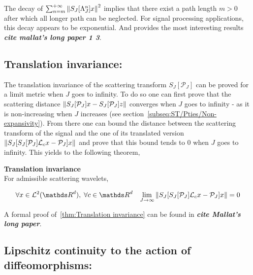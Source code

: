 \documentclass[a4paper,11pt]{report}
\begin{document}
{			The decay of $\sum_{n=m}^{+\infty} \left\lVert S_{J}[\Lambda_{J}^{n}]x \right\rVert^{2}$ implies that there exist a path length $m > 0$ after which all longer path can be neglected. For signal processing applications, this decay appears to be exponential. And  provides the most interesting results \textbf{\textit{cite mallat's long paper 1 3}}.
			
		\subsection{Translation invariance:}
			\label{subseq:ST/Pties/Translation}
			
			The translation invariance of the scattering transform $S_{J}[\mathcal{P}_{J}]$ can be proved for a limit metric when $J$ goes to infinity. To do so one can first prove that the scattering distance $\left\lVert S_{J}[\mathcal{P}_{J}]x - S_{J}[\mathcal{P}_{J}]z \right\rVert$ converges when $J$ goes to infinity - as it is non-increasing when $J$ increases (see section~\ref{subseq:ST/Pties/Non-expansivity}). From there one can bound the distance between the scattering transform of the signal and the one of its translated version $\left\lVert S_{J}[ S_{J}[\mathcal{P}_{J}]\mathcal{L}_{c}x - \mathcal{P}_{J}]x \right\rVert$ and prove that this bound tends to $0$ when $J$ goes to infinity. This yields to the following theorem,
			
			\begin{thm} \textbf{Translation invariance}\\
				For admissible scattering wavelets,
				
				\begin{equation}
					\forall x \in \mathcal{L}^{2}(\dsR^{d}), \; \forall c \in \dsR^{d} \;\;\; \lim_{J \rightarrow \infty} \norm{S_{J}[ S_{J}[\mathcal{P}_{J}]\mathcal{L}_{c}x - \mathcal{P}_{J}]x} = 0
					\label{eq:Tranlation invariance}
				\end{equation}
				\label{thm:Translation invariance}
			  
			\end{thm}

			\begin{note}
			  A formal proof of~\ref{thm:Translation invariance} can be found in \textbf{\textit{cite Mallat's long paper}}.
			\end{note}
	
		\subsection{Lipschitz continuity to the action of diffeomorphisms:}
			\label{subseq:ST/Pties/Lipschitz continuity}
			
}
\end{document}
